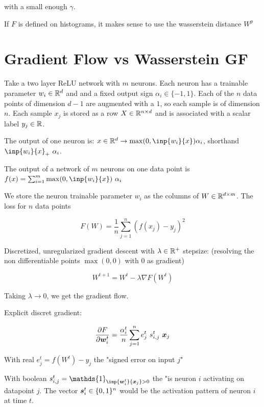 with a small enough $\gamma$.

If $F$ is defined on histograms, it makes sense to use the wasserstein distance $W^p$

\section{Gradient Flow vs Wasserstein GF}

Take a two layer ReLU network with $m$ neurons. Each neuron has a trainable parameter $w_i \in \mathbb{R}^d$ and and a fixed output sign $\alpha_i \in \{-1, 1\}$. Each of the $n$ data points of dimension $d-1$ are augmented with a $1$, so each sample is of dimension $n$. Each sample $x_j$ is stored as a row $X \in \mathbb{R}^{n \times d}$  and is associated with a scalar label $y_j \in \mathbb{R}$.

The output of one neuron is: $x \in \R^d \rightarrow \max(0, \inp{w_i}{x}) \alpha_i$, shorthand $\inp{w_i}{x}_+ ~ \alpha_i$.

The output of a network of $m$ neurons on one data point is $f(x) = \sum_{i=1}^{m} \max(0, \inp{w_i}{x}) ~ \alpha_i$

We store the neuron trainable parameter $w_i$ as the columns of $W \in \mathbb{R}^{d \times m}$. The loss for $n$ data points

\begin{equation}
	F(W) = \frac{1}{n} \sum_{j=1}^{n} \left(f(x_j) - y_j\right)^2
\end{equation}

Discretized, unregularized gradient descent with $\lambda \in \mathbb{R}^+$ stepsize: (resolving the non differentiable points $\max(0, 0)$ with 0 as gradient)

\begin{equation}
	W^{t+1} = W^t - \lambda \nabla F(W^t)
\end{equation}

Taking $\lambda \rightarrow 0$, we get the gradient flow.

Explicit discret gradient:

\begin{equation}
	\frac{\partial F}{\partial {\bm{w}}^t_i} = \frac{\alpha^t_i}{n} \sum_{j=1}^{n} e^t_j ~ s^t_{i, j} ~ {\bm{x}}_j
\end{equation}

With real $e^t_j = f(W^t) - y_j$ the "signed error on input $j$"

With boolean $s^t_{i, j} = \mathds{1}_{\inp{\vw^t_i}{\vx_j} > 0}$ the "is neuron $i$ activating on datapoint $j$. The vector ${\bm{s}}^t_{i} \in \{0, 1\}^n$ would be the activation pattern of neuron $i$ at time $t$.

